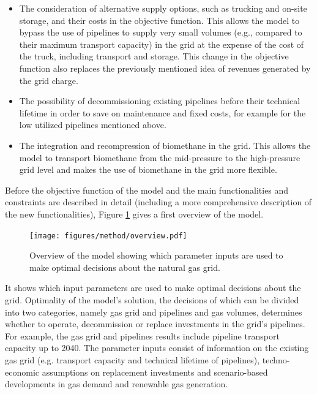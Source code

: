 \begin{itemize}
	\item The consideration of alternative supply options, such as trucking and on-site storage, and their costs in the objective function. This allows the model to bypass the use of pipelines to supply very small volumes (e.g., compared to their maximum transport capacity) in the grid at the expense of the cost of the truck, including transport and storage. This change in the objective function also replaces the previously mentioned idea of revenues generated by the grid charge. 
	\item The possibility of decommissioning existing pipelines before their technical lifetime in order to save on maintenance and fixed costs, for example for the low utilized pipelines mentioned above.
	\item The integration and recompression of biomethane in the grid. This allows the model to transport biomethane from the mid-pressure to the high-pressure grid level and makes the use of biomethane in the grid more flexible. 
\end{itemize}

Before the objective function of the model and the main functionalities and constraints are described in detail (including a more comprehensive description of the new functionalities), Figure \ref{method:overview} gives a first overview of the model. 

 \begin{figure}[h]
 	\centering
 	\texttt{[image: figures/method/overview.pdf]}
 	\caption{Overview of the model showing which parameter inputs are used to make optimal decisions about the natural gas grid.}
 	\label{method:overview}
 \end{figure}
 
It shows which input parameters are used to make optimal decisions about the grid. Optimality of the model's solution, the decisions of which can be divided into two categories, namely gas grid and pipelines and gas volumes, determines whether to operate, decommission or replace investments in the grid's pipelines. For example, the gas grid and pipelines results include pipeline transport capacity up to 2040. The parameter inputs consist of information on the existing gas grid (e.g. transport capacity and technical lifetime of pipelines), techno-economic assumptions on replacement investments and scenario-based developments in gas demand and renewable gas generation.  

